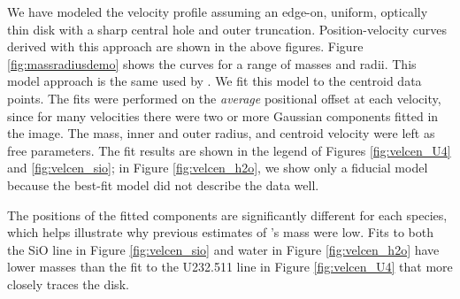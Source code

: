 \documentclass[twocolumn]{aastex61}
\newcommand{\msun}{\ensuremath{M_{\odot}}\xspace}			%
\newcommand{\water}{H$_{2}$O\xspace}		%
\newcommand{\kms}{\textrm{km~s}\ensuremath{^{-1}}\xspace}	%
\begin{document}


We have modeled the velocity profile assuming an edge-on, uniform, optically
thin disk with a sharp central hole and outer truncation.  Position-velocity
curves derived with this approach are shown in the above figures. Figure
\ref{fig:massradiusdemo} shows the curves for a range of masses and radii.
This model approach is the same used by \citet{Plambeck2016a}.  We fit this
model to the centroid data points.  The fits were performed on the
\emph{average} positional offset at each velocity, since for many velocities
there were two or more Gaussian components fitted in the image.  The mass,
inner and outer radius, and centroid velocity were left as free parameters.
The fit results are shown in the legend of Figures 
\ref{fig:velcen_U4} and \ref{fig:velcen_sio}; in Figure \ref{fig:velcen_h2o},
we show only a fiducial model because the best-fit model did not describe
the data well.

The positions of the fitted components are significantly different for each
species, which helps illustrate why previous estimates of \sourcei's mass were
low.  Fits to both the SiO line in Figure \ref{fig:velcen_sio} and water in
Figure \ref{fig:velcen_h2o} have lower masses than the fit to the U232.511 line
in Figure \ref{fig:velcen_U4} that more closely traces the disk.



\end{document}
